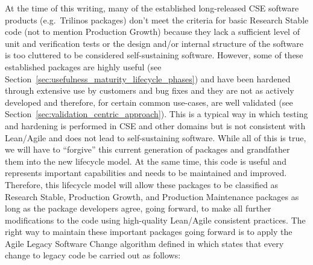 \documentclass[11pt]{SANDreport}
\begin{document}
At the time of this writing, many of the established long-released CSE
software products (e.g.\ Trilinos packages) don't meet the criteria
for basic Research Stable code (not to mention Production Growth)
because they lack a sufficient level of unit and verification tests or
the design and/or internal structure of the software is too cluttered
to be considered self-sustaining software.  However, some of these
established packages are highly useful (see
Section~\ref{sec:usefulness_maturity_lifecycle_phases}) and have been
hardened through extensive use by customers and bug fixes and they are
not as actively developed and therefore, for certain common use-cases,
are well validated (see
Section~\ref{sec:validation_centric_approach}).  This is a typical way
in which testing and hardening is performed in CSE and other domains
but is not consistent with Lean/Agile and does not lead to
self-sustaining software.  While all of this is true, we will have to
``forgive'' this current generation of packages and grandfather them
into the new lifecycle model.  At the same time, this code is useful
and represents important capabilities and needs to be maintained and
improved.  Therefore, this lifecycle model will allow these packages
to be classified as Research Stable, Production Growth, and Production
Maintenance packages as long as the package developers agree, going
forward, to make all further modifications to the code using
high-quality Lean/Agile consistent practices.  The right way to
maintain these important packages going forward is to apply the Agile
Legacy Software Change algorithm defined in
{}\cite{WorkingEffectivelyWithLegacyCode05} which states that every
change to legacy code be carried out as follows:
\end{document}
